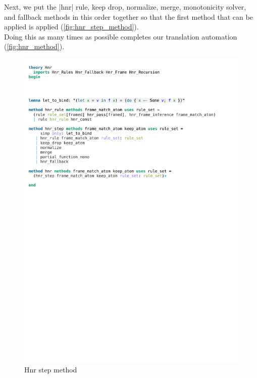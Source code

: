 \noindent Next, we put the |hnr| rule, keep drop, normalize, merge, monotonicity solver, and fallback methods in this order together so that the first method that can be applied is applied (\autoref{fig:hnr_step_method}).\\
Doing this as many times as possible completes our translation automation (\autoref{fig:hnr_method}).

\begin{figure}[htpb]
    \includegraphics[trim={0 19,2cm 0 6,6cm}, clip, width=1.00\textwidth]{figures/Theory_Hnr.pdf}
    \caption[Hnr step method]{Hnr step method}
    \label{fig:hnr_step_method}
\end{figure}

